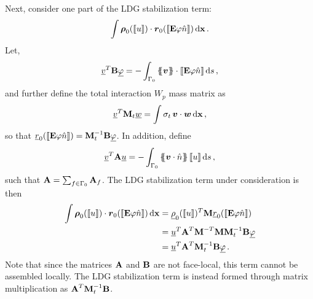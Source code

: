 \documentclass[../doc.tex]{subfiles}
\begin{document}
Next, consider one part of the LDG stabilization term: 
	\begin{equation}
		\int \vec{\rho}_0(\jump{u}) \cdot \vec{r}_0(\jump{\E\varphi\hat{n}}) \ud \x \,. 
	\end{equation}
Let, 
	\begin{equation}
		\underline{v}^T \mat{B} \underline{\varphi} = -\int_{\Gamma_0} \avg{\vec{v}}\cdot \jump{\E\varphi\hat{n}} \ud s \,,
	\end{equation}
and further define the total interaction $W_p$ mass matrix as 
	\begin{equation}
		\underline{v}^T \mat{M}_t \underline{w} = \int \sigma_t\, \vec{v} \cdot \vec{w} \ud \x \,, 
	\end{equation}
so that $\underline{r}_0\!\paren{\jump{\E\varphi\hat{n}}} = \mat{M}_t^{-1} \mat{B} \underline{\varphi}$. In addition, define 
	\begin{equation}
		\underline{v}^T \mat{A} \underline{u} = - \int_{\Gamma_0} \avg{\vec{v}\cdot\hat{n}} \jump{u} \ud s \,, 
	\end{equation}
such that $\mat{A} = \sum_{f\in\Gamma_0} \mat{A}_f$. The LDG stabilization term under consideration is then 
	\begin{equation}
	\begin{aligned}
	 	\int \vec{\rho}_0(\jump{u})\cdot\vec{r}_0\!\paren{\jump{\E\varphi\hat{n}}} \ud \x &= \underline{\rho}_0(\jump{u})^T \mat{M} \underline{r}_0\!\paren{\jump{\E\varphi\hat{n}}} \\
		&= \underline{u}^T \mat{A}^T \mat{M}^{-T} \mat{M} \mat{M}_t^{-1} \mat{B} \underline{\varphi} \\
		&= \underline{u}^T \mat{A}^T\mat{M}_t^{-1}\mat{B} \underline{\varphi} \,.
	\end{aligned}
	\end{equation} 
Note that since the matrices $\mat{A}$ and $\mat{B}$ are not face-local, this term cannot be assembled locally. The LDG stabilization term is instead formed through matrix multiplication as $\mat{A}^T\mat{M}_t^{-1}\mat{B}$. 
\end{document}
